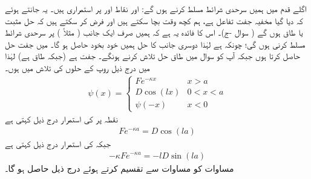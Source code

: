  اگلے قدم میں ہمیں سرحدی شرائط مسلط کرنے ہوں گے:  اور  نقاط   اور  پر استمراری ہیں۔  یہ جانتے ہوئے کہ دیا گیا  مخفیہ جفت تفاعل ہے، ہم کچھ وقت بچا سکتے ہیں اور  فرض کر سکتے ہیں کہ حل مثبت یا  طاق  ہوں گے ( سوال -ج)۔ اس کا فائدہ  یہ  ہے کہ ہمیں صرف ایک جانب (    مثلاً ) پر    سرحدی شرائط مسلط کرنی ہوں  گی؛   چونکہ ہے لہٰذا  دوسری جانب کا حل  ہمیں خود  بخود   حاصل ہو گا۔  میں جفت حل حاصل کرتا ہوں جبکہ آپ کو سوال   میں طاق   حل تلاش کرنے ہونگے۔ جفت ہے (جبکہ طاق ہے)  لہٰذا  میں درج ذیل  روپ کے حلوں  کی تلاش میں ہوں۔ 
\begin{align}\label{مساوات_شروڈنگر_تلاش_تفاعلات}
\psi(x)=
\begin{cases}
Fe^{-\kappa x} & x> a\\
D\cos(l x) & 0< x < a\\
\psi(-x) & x< 0
\end{cases}
\end{align}
نقطہ پر    کی استمرار  درج ذیل کہتی ہے  
\begin{align}\label{مساوات_شروڈنگر_استمرار_مستقل_الف}
 Fe^{-\kappa a}=D\cos(la) 
 \end{align}
 جبکہ  کی استمرار درج ذیل  کہتی ہے
 \begin{align}\label{مساوات_شروڈنگر_استمرار_مستقل_ب}
 -\kappa Fe^{-\kappa a}=-lD\sin(la) 
 \end{align} 
 مساوات     کو مساوات  سے تقسیم کرتے ہوئے درج ذیل  حاصل ہو گا۔

